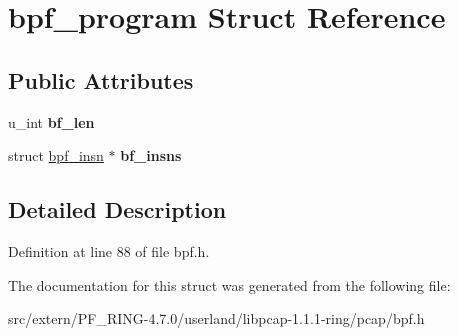 \hypertarget{structbpf__program}{
\section{bpf\_\-program Struct Reference}
\label{structbpf__program}
}
\subsection*{Public Attributes}
\begin{DoxyCompactItemize}
\item 
\hypertarget{structbpf__program_a35bd70e766e29d34c3dfc833a079ae0b}{
u\_\-int {\bfseries bf\_\-len}}
\label{structbpf__program_a35bd70e766e29d34c3dfc833a079ae0b}

\item 
\hypertarget{structbpf__program_a0154fac80d1fe5e15e7482706b5be29e}{
struct \hyperlink{structbpf__insn}{bpf\_\-insn} $\ast$ {\bfseries bf\_\-insns}}
\label{structbpf__program_a0154fac80d1fe5e15e7482706b5be29e}

\end{DoxyCompactItemize}


\subsection{Detailed Description}


Definition at line 88 of file bpf.h.



The documentation for this struct was generated from the following file:\begin{DoxyCompactItemize}
\item 
src/extern/PF\_\-RING-\/4.7.0/userland/libpcap-\/1.1.1-\/ring/pcap/bpf.h\end{DoxyCompactItemize}
